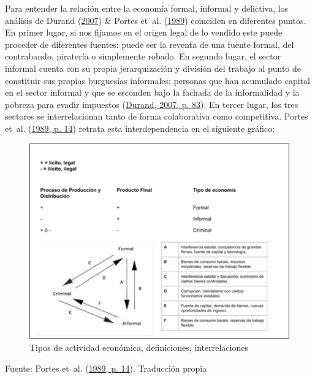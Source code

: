 \documentclass[
  letterpaper,
  12pt,
  oneside,
  spanish,
  doublespacing,
  headsepline,
  parskip]{MastersDoctoralThesis}
\begin{document}
Para entender la relación entre la economía formal, informal y
delictiva, los análisis de Durand
(\protect\hyperlink{ref-durand2007}{2007}) \& Portes et~al.
(\protect\hyperlink{ref-theinfo1989}{1989}) coinciden en diferentes
puntos. En primer lugar, si nos fijamos en el origen legal de lo vendido
este puede proceder de diferentes fuentes: puede ser la reventa de una
fuente formal, del contrabando, piratería o simplemente robado. En
segundo lugar, el sector informal cuenta con su propia jerarquización y
división del trabajo al punto de constituir sus propias burguesías
informales: personas que han acumulado capital en el sector informal y
que se esconden bajo la fachada de la informalidad y la pobreza para
evadir impuestos (\protect\hyperlink{ref-durand2007}{Durand, 2007, p.
83}). En tercer lugar, los tres sectores se interrelacionan tanto de
forma colaborativa como competitiva. Portes et~al.
(\protect\hyperlink{ref-theinfo1989}{1989, p. 14}) retrata esta
interdependencia en el siguiente gráfico:

\begin{figure}

\caption{\label{fig-esquema}Tipos de actividad económica, definiciones,
interrelaciones}

{\centering \includegraphics[width=5.20833in,height=\textheight]{Chapters/../Figures/portes_informal.pdf}

}

\end{figure}

\noindent \small Fuente: Portes et~al.
(\protect\hyperlink{ref-theinfo1989}{1989, p. 14}). Traducción propia
\normalsize
\end{document}
